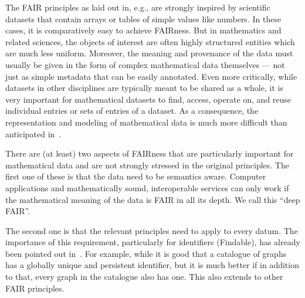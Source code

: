 The FAIR principles as laid out in, e.g., \cite{WilDumAal:FAIR16} are strongly inspired by scientific datasets that contain arrays or tables of simple values like numbers.
In these cases, it is comparatively easy to achieve FAIRness.
But in mathematics and related sciences, the objects of interest are often highly structured entities which are much less uniform.
Moreover, the meaning and provenance of the data must usually be given in the form of complex mathematical data themselves --- not just as simple metadata that can be easily annotated.
Even more critically, while datasets in other disciplines are typically meant to be shared as a whole, it is very important for mathematical datasets to find, access, operate on, and reuse individual entries or sets of entries of a dataset.
As a consequence, the representation and modeling of mathematical data is much more difficult than anticipated in~\cite{WilDumAal:FAIR16}.

There are (at least) two aspects of FAIRness that are particularly important for mathematical data and 
are not strongly stressed in the original principles.
The first one of these is that the data need to be semantics aware.
Computer applications and mathematically sound, interoperable services
can only work if the mathematical meaning of the data is FAIR in all its depth.
We call this ``deep FAIR''.


The second one is that the relevant principles need to apply to every datum.
The importance of this requirement, particularly for identifiers (Findable),
has already been pointed out in~\cite{BilTen:fingerprint13}.
For example, while it is good that a catalogue of graphs has a globally unique and persistent identifier,
but it is much better if in addition to that, every graph in the catalogue also has one.
This also extends to other FAIR principles.



